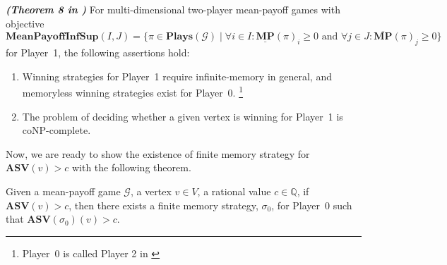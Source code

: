 \begin{theorem}
\label{ThmMemlessStrForP2NonEps}
\textbf{\emph{(Theorem 8 in \cite{VCDHRR15})}} For multi-dimensional two-player mean-payoff games with objective \\
$\mathbf{MeanPayoffInfSup}(I,J) = \{\pi \in \mathbf{Plays}(\mathcal{G}) \mid \forall i \in I : \underline{\mathbf{MP}}(\pi)_i \geqslant 0 \text{ and } \forall j \in J : \overline{\mathbf{MP}}(\pi)_j \geqslant 0\}$ for Player~1, the following assertions hold:
\begin{enumerate}
    \item Winning strategies for Player~1 require infinite-memory in general, and memoryless winning strategies exist for Player~0. \footnote{Player~0 is called Player 2 in \cite{VCDHRR15}}
    \item The problem of deciding whether a given vertex is winning for Player~1 is coNP-complete.
\end{enumerate}
\end{theorem}

Now, we are ready to show the existence of finite memory strategy for $\mathbf{ASV}(v) > c$ with the following theorem.

\begin{lemma}
\label{LemFinMemWitnessASVNonEps}
Given a mean-payoff game $\mathcal{G}$, a vertex $v \in V$, a rational value $c \in \mathbb{Q}$, if $\mathbf{ASV}(v) > c$, then there exists a finite memory strategy, $\sigma_0$, for Player~0 such that $\mathbf{ASV}(\sigma_0)(v) > c$.
\end{lemma}

